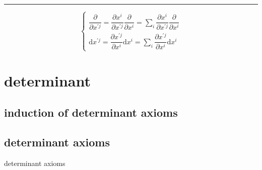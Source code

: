 \documentclass[
]{book}
\theoremstyle{definition}
\theoremstyle{definition}
\theoremstyle{definition}
\theoremstyle{definition}
\theoremstyle{remark}
\begin{document}
\begin{center}\rule{0.5\linewidth}{0.5pt}\end{center}

\[
\begin{cases}
\dfrac{\partial}{\partial x^{\prime{\scriptscriptstyle j}}}=\dfrac{\partial x^{{\scriptscriptstyle i}}}{\partial x^{\prime{\scriptscriptstyle j}}}\dfrac{\partial}{\partial x^{{\scriptscriptstyle i}}}=\sum\limits _{i}\dfrac{\partial x^{{\scriptscriptstyle i}}}{\partial x^{\prime{\scriptscriptstyle j}}}\dfrac{\partial}{\partial x^{{\scriptscriptstyle i}}}\\
\mathrm{d}x^{\prime{\scriptscriptstyle j}}=\dfrac{\partial x^{\prime{\scriptscriptstyle j}}}{\partial x^{{\scriptscriptstyle i}}}\mathrm{d}x^{{\scriptscriptstyle i}}=\sum\limits_{i}\dfrac{\partial x^{\prime{\scriptscriptstyle j}}}{\partial x^{{\scriptscriptstyle i}}}\mathrm{d}x^{{\scriptscriptstyle i}}
\end{cases}
\]

\hypertarget{determinant}{%
\chapter{determinant}\label{determinant}}

\hypertarget{induction-of-determinant-axioms}{%
\section{induction of determinant axioms}\label{induction-of-determinant-axioms}}

\hypertarget{determinant-axioms}{%
\section{determinant axioms}\label{determinant-axioms}}

determinant axioms
\end{document}
